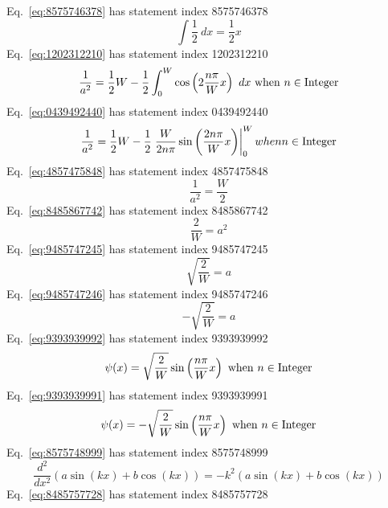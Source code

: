 \documentclass[12pt]{report}
\newcommand{\when}[1]{{\rm \ when\ }#1}
\begin{document}
Eq.~\ref{eq:8575746378} has statement index 8575746378
\begin{equation}
\int \frac{1}{2}\ dx = \frac{1}{2} x
\label{eq:8575746378}
\end{equation}
Eq.~\ref{eq:1202312210} has statement index 1202312210
\begin{equation}
\frac{1}{a^2}= \frac{1}{2}W - \frac{1}{2} \int_0^W \cos\left(2\frac{n \pi}{W}x\right)\ dx\when{n \in {\rm Integer}}
\label{eq:1202312210}
\end{equation}
Eq.~\ref{eq:0439492440} has statement index 0439492440
\begin{equation}
\frac{1}{a^2}= \frac{1}{2}W - \frac{1}{2}\left. \frac{W}{2n\pi}\sin\left(\frac{2n\pi}{W} x\right)\right|_0^W    when{n \in {\rm Integer}}
\label{eq:0439492440}
\end{equation}
Eq.~\ref{eq:4857475848} has statement index 4857475848
\begin{equation}
\frac{1}{a^2}= \frac{W}{2}
\label{eq:4857475848}
\end{equation}
Eq.~\ref{eq:8485867742} has statement index 8485867742
\begin{equation}
\frac{2}{W}= a^2
\label{eq:8485867742}
\end{equation}
Eq.~\ref{eq:9485747245} has statement index 9485747245
\begin{equation}
\sqrt{\frac{2}{W}}= a
\label{eq:9485747245}
\end{equation}
Eq.~\ref{eq:9485747246} has statement index 9485747246
\begin{equation}
-\sqrt{\frac{2}{W}}= a
\label{eq:9485747246}
\end{equation}
Eq.~\ref{eq:9393939992} has statement index 9393939992
\begin{equation}
\psi(x)=\sqrt{\frac{2}{W}} \sin\left(\frac{n \pi}{W} x\right) \when{n \in {\rm Integer}}
\label{eq:9393939992}
\end{equation}
Eq.~\ref{eq:9393939991} has statement index 9393939991
\begin{equation}
\psi(x)=-\sqrt{\frac{2}{W}} \sin\left(\frac{n \pi}{W} x\right) \when{n \in {\rm Integer}}
\label{eq:9393939991}
\end{equation}
Eq.~\ref{eq:8575748999} has statement index 8575748999
\begin{equation}
\frac{d^2}{dx^2} \left(a \sin(k x) + b \cos(k x)\right) = -k^2 \left(a \sin(kx) + b \cos(kx)\right)
\label{eq:8575748999}
\end{equation}
Eq.~\ref{eq:8485757728} has statement index 8485757728
\end{document}
